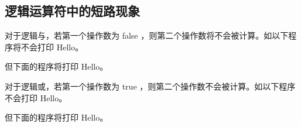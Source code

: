 \subsection{逻辑运算符中的短路现象}

\begin{frame}\ft{\subsecname} 
对于逻辑与，若第一个操作数为 {\tf false} ，则第二个操作数将不会被计算。如以下程序将不会打印 {\tf Hello}。


\end{frame}

\begin{frame}[fragile]\ft{\subsecname} 
但下面的程序将打印 {\tf Hello}。

\end{frame}

\begin{frame}[fragile]\ft{\subsecname} 
对于逻辑或，若第一个操作数为 {\tf true} ，则第二个操作数不会被计算。如以下程序不会打印 {\tf Hello}。


\end{frame}

\begin{frame}[fragile]\ft{\subsecname} 

但下面的程序将打印 {\tf Hello}。


\end{frame}
